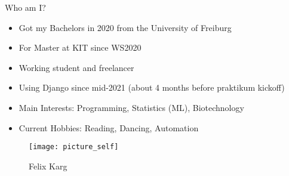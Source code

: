 \begin{frame}[c]{Who am I?}
    \begin{multicols}{2}
        \begin{itemize}[<+(1)->]
            \item Got my Bachelors in 2020 from the University of Freiburg
            \item For Master at KIT since WS2020
            \item Working student and freelancer
            \item Using Django since mid-2021 (about 4 months before praktikum kickoff)
            \item Main Interests: Programming, Statistics (ML), Biotechnology
            \item Current Hobbies: Reading, Dancing, Automation
        \end{itemize}
        \begin{figure}
        \texttt{[image: picture\_self]} \\
        \caption*{Felix Karg}
        \end{figure}
    \end{multicols}
\end{frame}


\iftwocols

\begin{frame}[c,plain]%
    \begin{minipage}{22em}
    \begin{multicols}{2}
    \tableofcontents[hideallsubsections]
    \end{multicols}
    \end{minipage}
\end{frame}

\else

\begin{frame}[c,plain]%
    \begin{minipage}{22em}
    \tableofcontents[hideallsubsections]
    \end{minipage}
\end{frame}
\fi


\newcommand{\pic}[2]{
\begin{frame}[c]{#1}
    \texttt{[image: Selection\_0\#2]}
\end{frame}
}

\newcommand{\p}[1]{{\color{ForestGreen}+#1}}
\newcommand{\m}[1]{{\color{red}-#1}}
